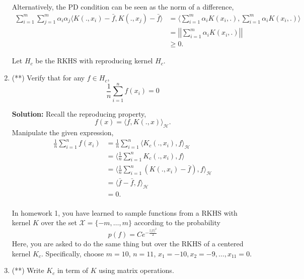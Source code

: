 \documentclass{article}[12pt]
\begin{document}
\begin{enumerate}
Alternatively, the PD condition can be seen as the norm of a difference,
\begin{equation}
	\begin{aligned}
		\sum^{m}_{i=1} \sum^{m}_{j=1} \alpha_i \alpha_j \langle K(., x_i) - \bar f, K(., x_j) - \bar f \rangle &= \langle \sum^{m}_{i=1} \alpha_i K(x_i, .), \sum^{m}_{i=1} \alpha_i K(x_i,.)   \rangle \\
														       &= \left| \left| \sum^{m}_{i=1} \alpha_i K(x_i, .)  \right| \right| \\
														       &\ge 0.
	\end{aligned}

\end{equation}

	
Let $H_c$ be the RKHS with reproducing kernel $H_c$. 
\item (**) Verify that for any $f \in H_c$, 
\begin{equation}
\frac{1}{n} \sum_{i=1}^n f(x_i)=0
\end{equation}

\textbf{Solution:} Recall the reproducing property,
\begin{equation}
	f(x) = \langle f, K(., x) \rangle_{\mathcal H}.
\end{equation}
Manipulate the given expression,
\begin{equation}
	\begin{aligned}
		\frac{1}{n} \sum^{n}_{i=1} f(x_i) &= \frac{1}{n} \sum^{n}_{i=1} \langle K_c(., x_i), f \rangle_{\mathcal H}  \\
	  &= \langle \frac{1}{n} \sum^{n}_{i=1} K_c(., x_i), f  \rangle \\
	  &= \langle \frac{1}{n} \sum^{n}_{i=1} \left( K(., x_i) - \bar{f} \right), f   \rangle_{\mathcal H} \\
	  &= \langle \bar{f} -\bar{f}, f \rangle_{\mathcal H}\\
	  &= 0. \\
	\end{aligned}
\end{equation}



In homework 1, you have learned to sample functions from a RKHS with kernel $K$ over the set $\mathcal{X}=\{-m,\ldots,m\}$ according to the probability 
\begin{equation}
p(f)=Ce^{-\frac{||f||^2}{2}}
\end{equation} 
Here, you are asked to do the same thing but over the RKHS of a centered kernel $K_c$. Specifically, choose  $m=10$, $n=11$, $x_1=-10,x_2=-9,\ldots,x_{11}=0$. 
\item (**) Write $K_c$ in term of $K$ using matrix operations. 


\end{enumerate}
\end{document}
